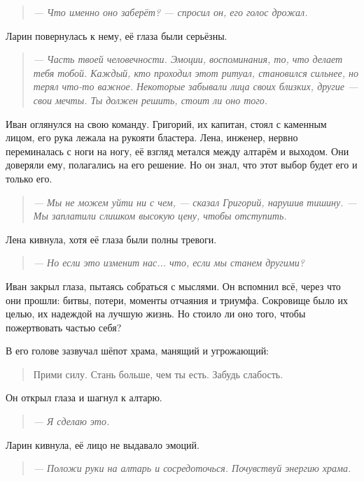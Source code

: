 \documentclass[12pt,a4paper]{book}
\newenvironment{dialogue}{\begin{quote}\itshape}{\end{quote}} %
\begin{document}
\begin{dialogue}
--- Что именно оно заберёт? --- спросил он, его голос дрожал.
\end{dialogue}

Ларин повернулась к нему, её глаза были серьёзны.

\begin{dialogue}
--- Часть твоей человечности. Эмоции, воспоминания, то, что делает тебя тобой. Каждый, кто проходил этот ритуал, становился сильнее, но терял что-то важное. Некоторые забывали лица своих близких, другие --- свои мечты. Ты должен решить, стоит ли оно того.
\end{dialogue}

Иван оглянулся на свою команду. Григорий, их капитан, стоял с каменным лицом, его рука лежала на рукояти бластера. Лена, инженер, нервно переминалась с ноги на ногу, её взгляд метался между алтарём и выходом. Они доверяли ему, полагались на его решение. Но он знал, что этот выбор будет его и только его.

\begin{dialogue}
--- Мы не можем уйти ни с чем, --- сказал Григорий, нарушив тишину. --- Мы заплатили слишком высокую цену, чтобы отступить.
\end{dialogue}

Лена кивнула, хотя её глаза были полны тревоги.

\begin{dialogue}
--- Но если это изменит нас... что, если мы станем другими?
\end{dialogue}

Иван закрыл глаза, пытаясь собраться с мыслями. Он вспомнил всё, через что они прошли: битвы, потери, моменты отчаяния и триумфа. Сокровище было их целью, их надеждой на лучшую жизнь. Но стоило ли оно того, чтобы пожертвовать частью себя?

В его голове зазвучал шёпот храма, манящий и угрожающий:

\begin{quote}
Прими силу. Стань больше, чем ты есть. Забудь слабость.
\end{quote}

Он открыл глаза и шагнул к алтарю.

\begin{dialogue}
--- Я сделаю это.
\end{dialogue}

Ларин кивнула, её лицо не выдавало эмоций.

\begin{dialogue}
--- Положи руки на алтарь и сосредоточься. Почувствуй энергию храма.
\end{dialogue}
\end{document}
